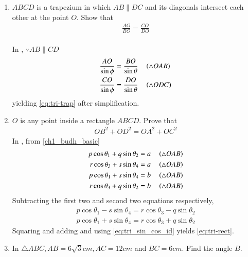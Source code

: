 \begin{enumerate}[label=\thesubsection.\arabic*.,ref=\thesubsection.\theenumi]
\item $ABCD$ is a trapezium in which $AB  \parallel  DC$ and its diagonals intersect each other at the point $O$. Show
that
\begin{align}
	\label{eq:tri-trap}	
\frac{AO}{ BO}=\frac{CO}{  DO}
\end{align}
\\
\solution 
	In , $\because AB \parallel CD$	
\begin{align}
	\frac{AO}{\sin \phi} &= \frac{BO}{\sin \theta} \quad \left(\triangle OAB\right)
	\\
	\frac{CO}{\sin \phi} &= \frac{DO}{\sin \theta} \quad \left(\triangle ODC\right)
\end{align}
yielding
	\eqref{eq:tri-trap}	
	after simplification.
\begin{figure}[H]
	\begin{center}
			\resizebox{0.6\columnwidth}{!}{}
	\end{center}
	\caption{}
	\label{fig:tri-trap}	
\end{figure}
\item $O$ is any point inside a rectangle $ABCD$. Prove that 
\begin{align}
	OB^2+OD^2 = OA^2+OC^2
	\label{eq:tri-rect}	
\end{align}
	\solution
	In 
	,	
from \eqref{ch1_budh_basic}
\begin{align}
	p \cos \theta_1+q \sin \theta_2 = a \quad \left(\triangle OAB\right)
	\\
	r \cos \theta_3+s \sin \theta_4 = a \quad \left(\triangle OAB\right)
	\\
	p \cos \theta_1+s \sin \theta_4 = b \quad \left(\triangle OAB\right)
	\\
	r \cos \theta_3+q \sin \theta_2 = b \quad \left(\triangle OAB\right)
\end{align}
Subtracting the first two and second two equations respectively,
\begin{align}
	p \cos \theta_1 
	-s \sin \theta_4  
= r \cos \theta_3-q \sin \theta_2
\\
	p \cos \theta_1+s \sin \theta_4 = 
	r \cos \theta_3+q \sin \theta_2  
\end{align}
Squaring and adding and using 
\eqref{eq:tri_sin_cos_id}
yields
	\eqref{eq:tri-rect}.	
\begin{figure}[H]
	\begin{center}
			\resizebox{0.6\columnwidth}{!}{}
	\end{center}
	\caption{}
	\label{fig:tri-rect}	
\end{figure}
\item  In  $\triangle  ABC, AB = 6\sqrt{3} cm, AC = 12 cm$ and $BC = 6 cm$. Find the angle $B$.
\end{enumerate}
